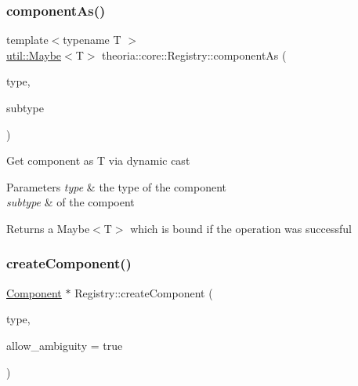 \subsubsection{\texorpdfstring{component\+As()}{componentAs()}\hspace{0.1cm}{\footnotesize\ttfamily [3/3]}}
{\footnotesize\ttfamily template$<$typename T $>$ \\
\hyperlink{classtheoria_1_1util_1_1Maybe}{util\+::\+Maybe}$<$T$>$ theoria\+::core\+::\+Registry\+::component\+As (\begin{DoxyParamCaption}\item[{const Type\+Name \&}]{type,  }\item[{const Sub\+Type\+Name \&}]{subtype }\end{DoxyParamCaption})\hspace{0.3cm}{\ttfamily [inline]}}

Get component as T via dynamic cast 
\begin{DoxyParams}{Parameters}
{\em type} & the type of the component \\
\hline
{\em subtype} & of the compoent \\
\hline
\end{DoxyParams}
\begin{DoxyReturn}{Returns}
a Maybe$<$\+T$>$ which is bound if the operation was successful 
\end{DoxyReturn}
\mbox{\label{classtheoria_1_1core_1_1Registry_a846b6ea01b2c4d3d1276796e9ef2b32b}} 
\subsubsection{\texorpdfstring{create\+Component()}{createComponent()}\hspace{0.1cm}{\footnotesize\ttfamily [1/3]}}
{\footnotesize\ttfamily \hyperlink{classtheoria_1_1core_1_1Component}{Component} $\ast$ Registry\+::create\+Component (\begin{DoxyParamCaption}\item[{const Type\+Name \&}]{type,  }\item[{int}]{allow\+\_\+ambiguity = {\ttfamily true} }\end{DoxyParamCaption})}

